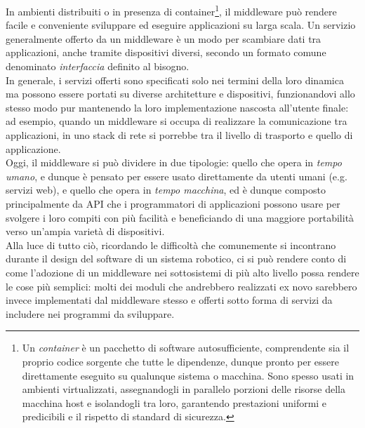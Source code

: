 In ambienti distribuiti o in presenza di container\footnote{Un \emph{container} è un pacchetto di software autosufficiente, comprendente sia il proprio codice sorgente che tutte le dipendenze, dunque pronto per essere direttamente eseguito su qualunque sistema o macchina. Sono spesso usati in ambienti virtualizzati, assegnandogli in parallelo porzioni delle risorse della macchina host e isolandogli tra loro, garantendo prestazioni uniformi e predicibili e il rispetto di standard di sicurezza.}, il middleware può rendere facile e conveniente sviluppare ed eseguire applicazioni su larga scala. Un servizio generalmente offerto da un middleware è un modo per scambiare dati tra applicazioni, anche tramite dispositivi diversi, secondo un formato comune denominato \emph{interfaccia} definito al bisogno.\\
In generale, i servizi offerti sono specificati solo nei termini della loro dinamica ma possono essere portati su diverse architetture e dispositivi, funzionandovi allo stesso modo pur mantenendo la loro implementazione nascosta all’utente finale: ad esempio, quando un middleware si occupa di realizzare la comunicazione tra applicazioni, in uno stack di rete si porrebbe tra il livello di trasporto e quello di applicazione.\\
Oggi, il middleware si può dividere in due tipologie: quello che opera in \emph{tempo umano}, e dunque è pensato per essere usato direttamente da utenti umani (e.g. servizi web), e quello che opera in \emph{tempo macchina}, ed è dunque composto principalmente da API che i programmatori di applicazioni possono usare per svolgere i loro compiti con più facilità e beneficiando di una maggiore portabilità verso un'ampia varietà di dispositivi.\\
Alla luce di tutto ciò, ricordando le difficoltà che comunemente si incontrano durante il design del software di un sistema robotico, ci si può rendere conto di come l'adozione di un middleware nei sottosistemi di più alto livello possa rendere le cose più semplici: molti dei moduli che andrebbero realizzati ex novo sarebbero invece implementati dal middleware stesso e offerti sotto forma di servizi da includere nei programmi da sviluppare.\vfill\newpage

